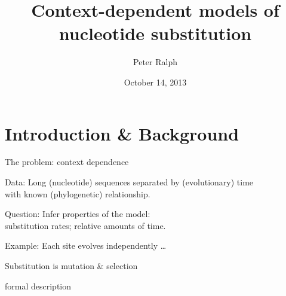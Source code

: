 \documentclass[smaller]{beamer}
\title[Context-dependent models] %
{Context-dependent models of nucleotide substitution}
\author %
{Peter Ralph}
\institute[USC]
{
  USC -- Computational Biology and Bioinformatics
  }
\date %
{October 14, 2013}
\begin{document}

%
%
%


\section{Introduction \& Background}

\begin{frame}{The problem: context dependence}

  {\struct Data:} Long (nucleotide) sequences separated by (evolutionary) time \\
    with known (phylogenetic) relationship.

  {\struct Question:} Infer properties of the model:\\
    substitution rates; relative amounts of time.

  {\struct Example:} Each site evolves independently \ldots

\end{frame}


\begin{frame}{Substitution is mutation \& selection}

  formal description 

\end{frame}
\end{document}
